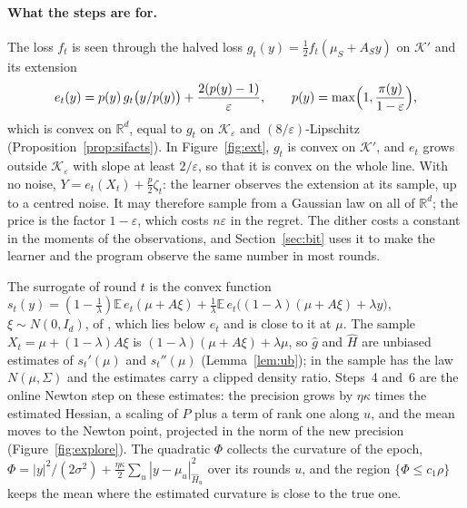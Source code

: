 \documentclass[11pt]{amsart}
\theoremstyle{definition}
\numberwithin{equation}{section}
\newcommand{\R}{\mathbb{R}}
\newcommand{\E}{\mathbb{E}}
\newcommand{\cK}{\mathcal{K}}
\begin{document}
\paragraph{What the steps are for.} The loss $f_t$ is seen through the halved loss $g_t(y)=\frac12f_t(\mu_S+A_Sy)$ on $\cK'$ and its extension
\[
e_t(y)=p(y)\,g_t\bigl(y/p(y)\bigr)+\frac{2(p(y)-1)}\varepsilon,\qquad p(y)=\max\Bigl(1,\frac{\pi(y)}{1-\varepsilon}\Bigr),
\]
which is convex on $\R^d$, equal to $g_t$ on $\cK_\varepsilon$ and $(8/\varepsilon)$-Lipschitz (Proposition~\ref{prop:sifacts}). In Figure~\ref{fig:ext}, $g_t$ is convex on $\cK'$, and $e_t$ grows outside $\cK_\varepsilon$ with slope at least $2/\varepsilon$, so that it is convex on the whole line. With no noise, $Y=e_t(X_t)+\frac p2\zeta_t$: the learner observes the extension at its sample, up to a centred noise. It may therefore sample from a Gaussian law on all of $\R^d$; the price is the factor $1-\varepsilon$, which costs $n\varepsilon$ in the regret. The dither costs a constant in the moments of the observations, and Section~\ref{sec:bit} uses it to make the learner and the program observe the same number in most rounds.

The surrogate of round $t$ is the convex function $s_t(y)=(1-\frac1\lambda)\E\,e_t(\mu+A\xi)+\frac1\lambda\E\,e_t\bigl((1-\lambda)(\mu+A\xi)+\lambda y\bigr)$, $\xi\sim N(0,I_d)$, of \cite[Chapter~11]{Lat24}, which lies below $e_t$ and is close to it at $\mu$. The sample $X_t=\mu+(1-\lambda)A\xi$ is $(1-\lambda)(\mu+A\xi)+\lambda\mu$, so $\hat g$ and $\hat H$ are unbiased estimates of $s_t'(\mu)$ and $s_t''(\mu)$ (Lemma~\ref{lem:ub}); in \cite[Chapter~11]{Lat24} the sample has the law $N(\mu,\Sigma)$ and the estimates carry a clipped density ratio. Steps~4 and~6 are the online Newton step on these estimates: the precision grows by $\eta\kappa$ times the estimated Hessian, a scaling of $P$ plus a term of rank one along $u$, and the mean moves to the Newton point, projected in the norm of the new precision (Figure~\ref{fig:explore}). The quadratic $\Phi$ collects the curvature of the epoch, $\Phi=|y|^2/(2\sigma^2)+\frac{\eta\kappa}2\sum_u|y-\mu_u|^2_{\hat H_u}$ over its rounds $u$, and the region $\{\Phi\le c_1\rho\}$ keeps the mean where the estimated curvature is close to the true one.
\end{document}
